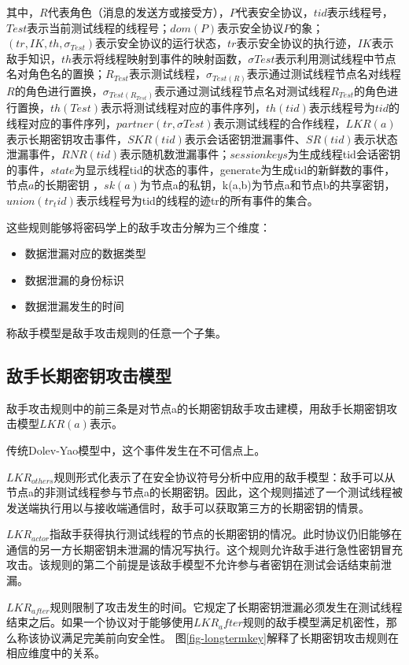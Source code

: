 其中，$R$代表角色（消息的发送方或接受方），$P$代表安全协议，$tid$表示线程号，$Test$表示当前测试线程的线程号；$dom(P)$表示安全协议$P$的象；$(tr, IK, th, σ_{Test})$表示安全协议的运行状态，$tr$表示安全协议的执行迹，$IK$表示敌手知识，$th$表示将线程映射到事件的映射函数，$σTest$表示利用测试线程中节点名对角色名的置换；$R_{Test}$表示测试线程，$σ_{Test(R)}$表示通过测试线程节点名对线程$R$的角色进行置换，$σ_{Test(R_{Test})}$表示通过测试线程节点名对测试线程$R_{Test}$的角色进行置换，$th(Test)$表示将测试线程对应的事件序列，$th(tid)$表示线程号为$tid$的线程对应的事件序列，$partner(tr, σTest)$表示测试线程的合作线程，$LKR(a)$表示长期密钥攻击事件，$SKR(tid)$表示会话密钥泄漏事件、$SR(tid)$表示状态泄漏事件，$RNR(tid)$表示随机数泄漏事件；$sessionkeys$为生成线程tid会话密钥的事件，$state$为显示线程tid的状态的事件，generate为生成tid的新鲜数的事件，节点$a$的长期密钥 ，$sk(a)$为节点a的私钥，k(a,b)为节点a和节点b的共享密钥，$union(tr_tid)$表示线程号为tid的线程的迹tr的所有事件的集合。


这些规则能够将密码学上的敌手攻击分解为三个维度：
\begin{itemize}
\item	数据泄漏对应的数据类型
\item	数据泄漏的身份标识
\item	数据泄漏发生的时间
\end{itemize}
称敌手模型是敌手攻击规则的任意一个子集。
\subsection{敌手长期密钥攻击模型}
敌手攻击规则中的前三条是对节点a的长期密钥敌手攻击建模，用敌手长期密钥攻击模型$LKR\left( a \right)$表示。


传统Dolev-Yao模型中，这个事件发生在不可信点上。

	  $LKR_{others}$规则形式化表示了在安全协议符号分析中应用的敌手模型：敌手可以从节点a的非测试线程参与节点a的长期密钥。因此，这个规则描述了一个测试线程被发送端执行用以与接收端通信时，敌手可以获取第三方的长期密钥的情景。


 $LKR_{actor}$指敌手获得执行测试线程的节点的长期密钥的情况。此时协议仍旧能够在通信的另一方长期密钥未泄漏的情况写执行。这个规则允许敌手进行急性密钥冒充攻击。该规则的第二个前提是该敌手模型不允许参与者密钥在测试会话结束前泄漏。

 $LKR_{after}$规则限制了攻击发生的时间。它规定了长期密钥泄漏必须发生在测试线程结束之后。如果一个协议对于能够使用$LKR_after$规则的敌手模型满足机密性，那么称该协议满足完美前向安全性。
图\ref{fig-longtermkey}解释了长期密钥攻击规则在相应维度中的关系。

